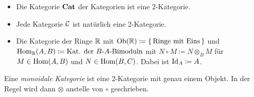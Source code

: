 \documentclass{cheat-sheet}
\newenvironment{centertikzcd}
  {\begin{center}\begin{tikzcd}}
  {\end{tikzcd}\end{center}}
\begin{document}
\begin{defn}
\end{defn}


\begin{bspe}
  \begin{itemize}
    \item Die Kategorie $\mathbf{Cat}$ der Kategorien ist eine 2-Kategorie.
    \item Jede Kategorie $\mathcal{C}$ ist natürlich eine 2-Kategorie.
    \item Die Kategorie der Ringe $\mathbb{R}$ mit $\operatorname{Ob}(\mathbb{R}) \coloneqq \{ \, \text{Ringe mit Eins} \, \}$ und $\operatorname{Hom}_{\mathbb{R}}(A, B) \coloneqq \text{Kat. der $B$-$A$-Bimoduln}$ mit $N \circ M \coloneqq N \otimes_B M$ für $M \in \operatorname{Hom}(A, B)$ und $N \in \operatorname{Hom}(B, C)$. Dabei ist $\operatorname{Id}_A \coloneqq A$. %
  \end{itemize}
\end{bspe}

\begin{defn}
  Eine \emph{monoidale Kategorie} ist eine 2-Kategorie mit genau einem Objekt.
  In der Regel wird dann $\otimes$ anstelle von $\circ$ geschrieben.
\end{defn}


\end{document}
